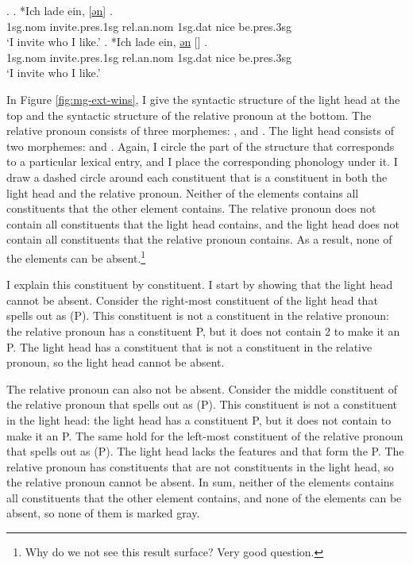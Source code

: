 \ex.\label{ex:mg-acc-nom-rep}
\ag. *Ich {lade ein}, [\underline{ən}] \underline{}   .\\
1\ac{sg}.\ac{nom} invite.\ac{pres}.1\ac{sg}\scsub{[acc]} \ac{rel}.\ac{an}.\ac{nom} 1\ac{sg}.\ac{dat} nice be.\ac{pres}.3\ac{sg}\scsub{[nom]}\\
`I invite who I like.' \label{ex:mg-acc-nom-rep-rel}
\bg. *Ich {lade ein}, \underline{ən} [\underline{}]   .\\
1\ac{sg}.\ac{nom} invite.\ac{pres}.1\ac{sg}\scsub{[acc]} \ac{rel}.\ac{an}.\ac{nom} 1\ac{sg}.\ac{dat} nice be.\ac{pres}.3\ac{sg}\scsub{[nom]}\\
`I invite who I like.' \label{ex:mg-acc-nom-rep-lh}

In Figure \ref{fig:mg-ext-wins}, I give the syntactic structure of the light head at the top and the syntactic structure of the relative pronoun at the bottom.
The relative pronoun consists of three morphemes: ,  and .
The light head consists of two morphemes:  and .
Again, I circle the part of the structure that corresponds to a particular lexical entry, and I place the corresponding phonology under it.
I draw a dashed circle around each constituent that is a constituent in both the light head and the relative pronoun.
Neither of the elements contains all constituents that the other element contains. The relative pronoun does not contain all constituents that the light head contains, and the light head does not contain all constituents that the relative pronoun contains. As a result, none of the elements can be absent.\footnote{
Why do we not see this result surface? Very good question.
}

I explain this constituent by constituent.
I start by showing that the light head cannot be absent.
Consider the right-most constituent of the light head that spells out as  (P). This constituent is not a constituent in the relative pronoun: the relative pronoun has a constituent P, but it does not contain 2 to make it an P.
The light head has a constituent that is not a constituent in the relative pronoun, so the light head cannot be absent.

The relative pronoun can also not be absent.
Consider the middle constituent of the relative pronoun that spells out as  (P). This constituent is not a constituent in the light head: the light head has a constituent P, but it does not contain  to make it an P.
The same hold for the left-most constituent of the relative pronoun that spells out as  (P). The light head lacks the features  and  that form the P.
The relative pronoun has constituents that are not constituents in the light head, so the relative pronoun cannot be absent.
In sum, neither of the elements contains all constituents that the other element contains, and none of the elements can be absent, so none of them is marked gray.

